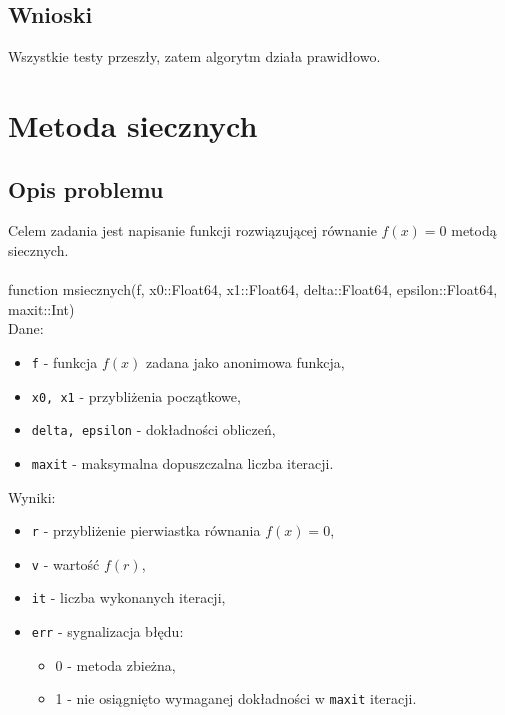 \documentclass{article}
\begin{document}
\subsection{Wnioski}
Wszystkie testy przeszły, zatem algorytm działa prawidłowo.


\section{Metoda siecznych}
\subsection{Opis problemu}
Celem zadania jest napisanie funkcji rozwiązującej równanie $f(x) = 0$ metodą siecznych.\\ \\
function msiecznych(f, x0::Float64, x1::Float64, delta::Float64, epsilon::Float64, maxit::Int) \\
Dane:
\begin{itemize}
     \item \texttt{f} - funkcja $f(x)$ zadana jako anonimowa funkcja,
     \item \texttt{x0, x1} - przybliżenia początkowe,
     \item \texttt{delta, epsilon} - dokładności obliczeń,
     \item \texttt{maxit} - maksymalna dopuszczalna liczba iteracji.
\end{itemize}
Wyniki:
\begin{itemize}
    \item \texttt{r} - przybliżenie pierwiastka równania $f(x) = 0$,
    \item \texttt{v} - wartość $f(r)$,
    \item \texttt{it} - liczba wykonanych iteracji,
    \item \texttt{err} - sygnalizacja błędu:
    \begin{itemize}[label={}]
        \item 0 - metoda zbieżna,
        \item 1 - nie osiągnięto wymaganej dokładności w \texttt{maxit} iteracji.
    \end{itemize}
\end{itemize}
\end{document}
